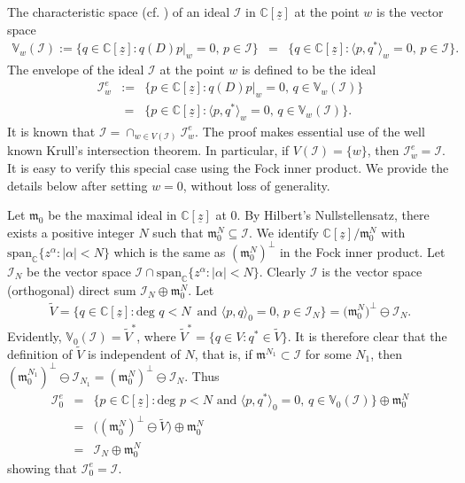 \documentclass[11pt]{amsart}
\theoremstyle{definition}
\numberwithin{equation}{section}
\begin{document}
The characteristic space (cf. \cite[page 11]{cg}) of an ideal $\mathcal I$ in ${{\mathbb C}}[\underline{z}]$ at the point $w$ is the vector space
\begin{eqnarray*}
\mathbb V_w(\mathcal I):= \{q\in{{\mathbb C}}[\underline{z}] : q(D)p|_w=0,\, p\in\mathcal I\}
&=&\{q\in{{\mathbb C}}[\underline{z}]: \langle p, q^*\rangle_w = 0,\, p \in \mathcal I\}.
\end{eqnarray*}
The envelope of the ideal $\mathcal I$ at the point $w$ is defined to be the ideal
\begin{eqnarray*}
\mathcal I^e_w &:=& \{p\in{{\mathbb C}}[\underline{z}] : q(D)p|_w=0,\,q\in\mathbb V_w(\mathcal I)\}\\ &~=& \{p\in{{\mathbb C}}[\underline{z}] : \langle p, q^*\rangle_w = 0,\,q \in \mathbb V_w(\mathcal I)\}.
\end{eqnarray*}
It is known \cite[Theorem 2.1.1, page 13]{cg} that $\mathcal I= \cap_{w\in V(\mathcal I)}\mathcal I_w^e$. The proof makes essential use of the well known Krull's intersection theorem. In particular, if $V(\mathcal I) = \{w\}$, then $\mathcal I_w^e = \mathcal I$.  It is easy to verify this special case using the Fock inner product.   We provide the details below after setting $w=0$, without loss of generality.

Let $\mathfrak m_0$ be the maximal
ideal in ${{\mathbb C}}[\underline z]$ at $0$.
By Hilbert's Nullstellensatz, there exists
a positive integer $N$ such that $\mathfrak m_0^N\subseteq\mathcal I$. We identify ${{\mathbb C}}[\underline{z}]/\mathfrak m_0^N$  with
$\mbox{span}_{{\mathbb C}}\{z^\alpha:|\alpha|<N\}$ which is the same as $(\mathfrak{m}_0^N)^{\perp}$ in the Fock inner product. 
Let $\mathcal I_N$ be the vector space $\mathcal I\cap \mbox{span}_{{\mathbb C}} \{z^\alpha:|\alpha|<N\}$. Clearly $\mathcal I$ is the vector space (orthogonal) direct sum $\mathcal I_N\oplus\mathfrak m_0^N$.  Let
\begin{eqnarray*}
\tilde V = \{q \in {{\mathbb C}}[\underline{z}]: \mbox{deg}\,\, q < N \,\mbox{~and~} \langle p,q \rangle_0 =0,\,p\in \mathcal I_N\}=\big (\mathfrak m_0^N\big )^{\perp} \ominus \mathcal I_N. \end{eqnarray*}
Evidently, $\mathbb{V}_0(\mathcal I) = \tilde V^*$, where $\tilde V^*=\{q\in V:q^*\in\tilde V\}$. It is therefore clear that the definition of $\tilde V$ is independent of $N$, that is, if $\mathfrak m^{N_1} \subset\mathcal I$ for some $N_1$, then $(\mathfrak m_0^{N_1} )^{\perp} \ominus \mathcal I_{N_1} = (\mathfrak m_0^N )^{\perp} \ominus \mathcal I_N$. Thus
\begin{eqnarray*}
\mathcal I^e_0 &=&
\{p\in{{\mathbb C}}[\underline{z}] : \mbox{deg}\,\, p < N\mbox{~and~}\langle p, q^*\rangle_0=0,\, q\in\mathbb V_0(\mathcal I)\} \oplus \mathfrak m_0^N\\
&=&\big ( (\mathfrak m_0^N)^\perp \ominus \tilde{V}\big )\oplus\mathfrak m_0^N\\
&=& \mathcal I_N \oplus \mathfrak m_0^N
\end{eqnarray*}
showing that $\mathcal I^e_0 = \mathcal I$.
\end{document}
